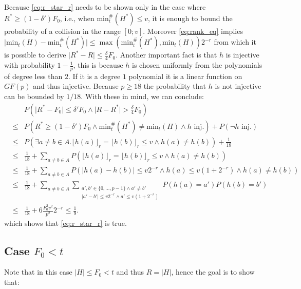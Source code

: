 \documentclass[11pt,a4paper]{article}
\newcommand{\size}[1]{\lvert#1\rvert}
\begin{document}
Because \autoref{eq:r_star_r} needs to be shown only in the case where $R^* \geq (1-\delta') F_0$, i.e., when $\mathrm{min}_t^{\#}(H^*) \leq v$,
it is enough to bound the probability of a collision in the range $[0; v]$.
Moreover \autoref{eq:rank_eq} implies $\size{\mathrm{min}_t(H) - \mathrm{min}_t^{\#}(H^*)} \leq \max(\mathrm{min}_t^{\#}(H^*), \mathrm{min}_t(H)) 2^{-r}$ from
which it is possible to derive $\size{R^*-R} \leq \frac{\delta}{4} F_0$.
Another important fact is that $h$ is injective with probability $1-\frac{1}{p}$, this is because $h$ is chosen uniformly from the polynomials of degree less than $2$.
If it is a degree $1$ polynomial it is a linear function on $GF(p)$ and thus injective.
Because $p \geq 18$ the probability that $h$ is not injective can be bounded by $1/18$. With these in mind, we can conclude: 
\begin{eqnarray*}
    & & P\left( \size{R^*-F_0} \leq \delta' F_0 \wedge \size{R-R^*} > \frac{\delta}{4} F_0 \right) \\
    & \leq & P\left( R^* \geq (1-\delta') F_0 \wedge \mathrm{min}_t^{\#}(H^*) \neq \mathrm{min}_t(H) \wedge h \textrm{ inj.}\right) + P(\neg h \textrm{ inj.}) \\
    & \leq & P\left( \exists a \neq b \in A. \lfloor h(a) \rfloor_r = \lfloor h(b) \rfloor_r \leq v \wedge h(a) \neq h(b) \right) + \frac{1}{18} \\
    & \leq & \frac{1}{18} + \sum_{a \neq b \in A} P\left(\lfloor h(a) \rfloor_r = \lfloor h(b) \rfloor_r \leq v \wedge h(a) \neq h(b) \right) \\
    & \leq & \frac{1}{18} + \sum_{a \neq b \in A} P\left(\size{h(a) - h(b)} \leq v 2^{-r} \wedge h(a) \leq v (1+2^{-r}) \wedge h(a) \neq h(b) \right) \\
    & \leq & \frac{1}{18} + \sum_{a \neq b \in A} \sum_{\substack{a', b' \in \{0,\ldots, p-1\} \wedge a' \neq b' \\ \size{a'-b'} \leq v 2^{-r} \wedge a' \leq v (1+2^{-r})}} P(h(a) = a') P(h(b)= b') \\
    & \leq & \frac{1}{18} + 6 \frac{F_0^2 v^2}{p^2} 2^{-r} \leq \frac{1}{9} \textrm{.}
\end{eqnarray*}
which shows that \autoref{eq:r_star_r} is true.\subsection{Case $F_0 < t$}
Note that in this case $\size{H} \leq F_0 < t$ and thus $R = \size{H}$, hence the goal is to show that:
\end{document}

